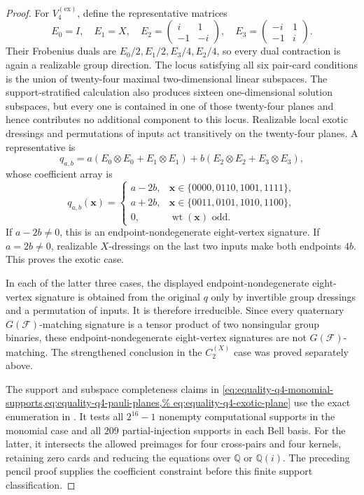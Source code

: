 \documentclass[11pt,letterpaper,onecolumn]{article}
\theoremstyle{plain}
\theoremstyle{definition}
\theoremstyle{remark}
\newcommand{\cF}{\mathcal F}
\newcommand{\CycX}[1]{{C_{#1}^{(X)}}}
\newcommand{\KleinEx}{{V_4^{(\mathrm{ex})}}}
\newcommand{\wt}{\operatorname{wt}}
\begin{document}
\begin{proof}
For \(\KleinEx\), define the representative matrices
\[
 E_0=I,\quad E_1=X,\quad
 E_2=\begin{pmatrix}i&1\\-1&-i\end{pmatrix},\quad
 E_3=\begin{pmatrix}-i&1\\-1&i\end{pmatrix}.
\]
Their Frobenius duals are
\(E_0/2,E_1/2,E_3/4,E_2/4\), so every dual contraction is again a realizable group direction.  The locus satisfying all six pair-card conditions is the union
of twenty-four maximal two-dimensional linear subspaces.  The
support-stratified calculation also produces sixteen one-dimensional
solution subspaces, but every one is contained in one of those twenty-four
planes and hence contributes no additional component to this locus.
Realizable local exotic dressings and permutations of inputs act transitively on
the twenty-four planes.  A representative is
\[
 q_{a,b}
 =a(E_0\otimes E_0+E_1\otimes E_1)
  +b(E_2\otimes E_2+E_3\otimes E_3),
\]
whose coefficient array is
\begin{equation}
q_{a,b}({\mathbf{x}})=
\begin{cases}
a-2b,&{\mathbf{x}}\in\{0000,0110,1001,1111\},\\
a+2b,&{\mathbf{x}}\in\{0011,0101,1010,1100\},\\
0,&\wt({\mathbf{x}})\text{ odd}.
\end{cases}
\label{eq:equality-q4-exotic-plane}
\end{equation}
If \(a-2b\ne0\), this is an endpoint-nondegenerate eight-vertex signature.  If \(a=2b\ne0\), realizable \(X\)-dressings
on the last two inputs make both endpoints \(4b\).  This proves the exotic
case.

In each of the latter three cases, the displayed endpoint-nondegenerate eight-vertex signature is obtained
from the original \(q\) only by invertible group dressings and a permutation of inputs.  It is therefore irreducible.  Since every quaternary
\(G(\cF)\)-matching signature is a tensor product of two nonsingular
group binaries, these endpoint-nondegenerate eight-vertex signatures are not \(G(\cF)\)-matching.  The
strengthened conclusion in the \(\CycX{2}\) case was proved separately above.

The support and subspace completeness claims in
\cref{eq:equality-q4-monomial-supports,eq:equality-q4-pauli-planes,%
eq:equality-q4-exotic-plane} use the exact enumeration in
.  It tests all \(2^{16}-1\)
nonempty computational supports in the monomial case and all \(209\)
partial-injection supports in each Bell basis.  For the latter, it
intersects the allowed preimages for four cross-pairs and four kernels,
retaining zero cards and reducing the equations over \(\mathbb Q\) or
\(\mathbb Q(i)\).  The preceding pencil proof supplies the coefficient
constraint before this finite support classification.
\end{proof}
\end{document}

